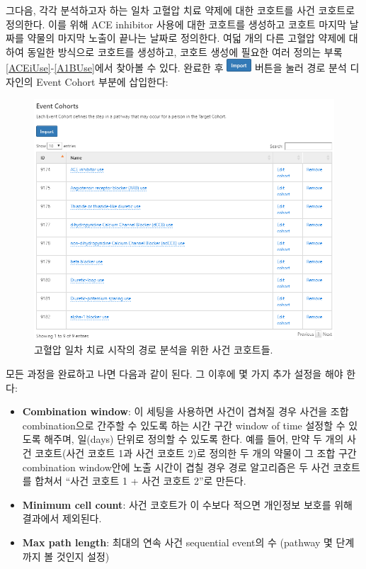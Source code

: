\documentclass[11pt]{book}
\providecommand{\tightlist}{%
  \setlength{\itemsep}{0pt}\setlength{\parskip}{0pt}}
\theoremstyle{definition}
\theoremstyle{definition}
\theoremstyle{definition}
\theoremstyle{remark}
\begin{document}
그다음, 각각 분석하고자 하는 일차 고혈압 치료 약제에 대한 코호트를 사건
코호트로 정의한다. 이를 위해 ACE inhibitor 사용에 대한 코호트를 생성하고
코호트 마지막 날짜를 약물의 마지막 노출이 끝나는 날짜로 정의한다. 여덟
개의 다른 고혈압 약제에 대하여 동일한 방식으로 코호트를 생성하고, 코호트
생성에 필요한 여러 정의는 부록 \ref{ACEiUse}-\ref{A1BUse}에서 찾아볼 수
있다. 완료한 후
\includegraphics{images/Characterization/atlasImportButton.png} 버튼을
눌러 경로 분석 디자인의 Event Cohort 부분에 삽입한다:

\begin{figure}

{\centering \includegraphics[width=1\linewidth]{images/Characterization/atlasPathwaysEventCohorts} 

}

\caption{고혈압 일차 치료 시작의 경로 분석을 위한 사건 코호트들.}\label{fig:atlasPathwaysEventCohorts}
\end{figure}

모든 과정을 완료하고 나면 다음과 같이 된다. 그 이후에 몇 가지 추가
설정을 해야 한다:

\begin{itemize}
\tightlist
\item
  \textbf{Combination window}: 이 세팅을 사용하면 사건이 겹쳐질 경우
  사건을 조합 combination으로 간주할 수 있도록 하는 시간 구간 window of
  time 설정할 수 있도록 해주며, 일(days) 단위로 정의할 수 있도록 한다.
  예를 들어, 만약 두 개의 사건 코호트(사건 코호트 1과 사건 코호트 2)로
  정의한 두 개의 약물이 그 조합 구간 combination window안에 노출 시간이
  겹칠 경우 경로 알고리즘은 두 사건 코호트를 합쳐서 ``사건 코호트 1 +
  사건 코호트 2''로 만든다.
\item
  \textbf{Minimum cell count}: 사건 코호트가 이 수보다 적으면 개인정보
  보호를 위해 결과에서 제외된다.
\item
  \textbf{Max path length}: 최대의 연속 사건 sequential event의 수
  (pathway 몇 단계까지 볼 것인지 설정)
\end{itemize}
\end{document}
